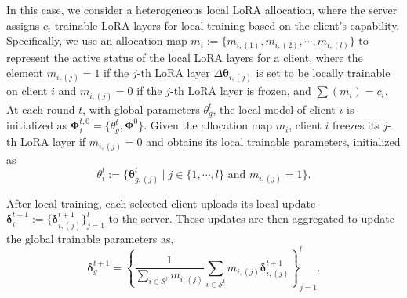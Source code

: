 \documentclass[lettersize,journal]{IEEEtran}
\begin{document}
{In this case, we consider a heterogeneous local LoRA allocation, where the server assigns $c_i$ trainable LoRA layers for local training based on the client's capability.}
Specifically, we use an allocation map $m_i:=\{m_{i,(1)}, m_{i,(2)}, \cdots, m_{i,(l)}\}$ to represent the active status of the local LoRA layers for a client, where the element $m_{i,(j)} = 1$ if the $j$-th LoRA layer $\Delta\boldsymbol{\theta}_{i,(j)}$ is set to be locally trainable on client $i$ and $m_{i,(j)} = 0$ if the $j$-th LoRA layer is frozen, and $\sum(m_i)=c_i$. At each round $t$, with global parameters $\boldsymbol{\mathcal{\theta}}_g^{t}$, the local model of client $i$ is initialized as $\boldsymbol{\Phi}_i^{t, 0} =\{\boldsymbol{\mathcal{\theta}}_g^t, \boldsymbol{\Phi}^0\}$. Given the allocation map $m_i$, client $i$ freezes its $j$-th LoRA layer if $m_{i,(j)}=0$ and obtains its local trainable parameters, initialized as 
\begin{equation}\label{eq:local-init}
\boldsymbol{\mathcal{\theta}}_i^{t} := \{\boldsymbol{\theta}^t_{g,(j)} \mid j \in \{1, \cdots, l\} \text{ and } m_{i,(j)} = 1\}.
\end{equation}

After local training, each {selected} client uploads its local update 
$\boldsymbol{\delta}_i^{t+1} := \{\boldsymbol{\delta}_{i,(j)}^{t+1}\}_{j=1}^{l}$ 
to the server. These updates are then aggregated to update the global trainable parameters as,
\begin{equation}\label{eq:agg}
    \boldsymbol{\delta}_{g}^{t+1} = \left\{\frac{1}{\sum_{i\in\mathcal{S}^t} m_{i,(j)}} \sum_{i\in\mathcal{S}^t}m_{i,(j)} \boldsymbol{\delta}_{i,(j)}^{t+1} \right\}_{j=1}^{l}.
\end{equation}
\end{document}
